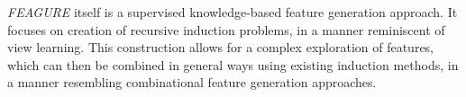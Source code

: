 \documentclass{article}
\theoremstyle{definition}
\begin{document}
\emph{FEAGURE} itself is a supervised knowledge-based feature generation approach. It focuses on creation of recursive induction problems, in a manner reminiscent of view learning. This construction allows for a complex exploration of features, which can then be combined in general ways using existing induction methods, in a manner resembling combinational feature generation approaches.




\end{document}
